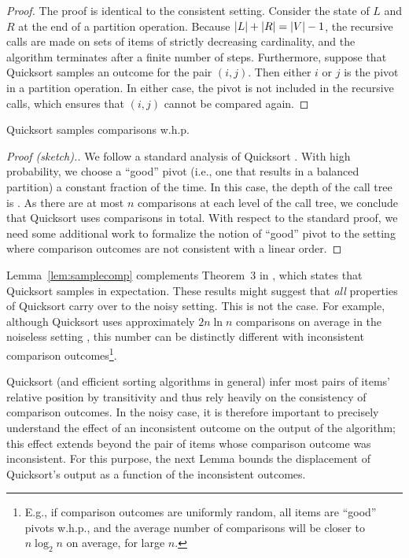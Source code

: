 \begin{proof}
The proof is identical to the consistent setting.
Consider the state of $L$ and $R$ at the end of a partition operation.
Because $\lvert L \rvert + \lvert R \rvert = \lvert V \rvert - 1$, the recursive calls are made on sets of items of strictly decreasing cardinality, and the algorithm terminates after a finite number of steps.
Furthermore, suppose that Quicksort samples an outcome for the pair $(i, j)$.
Then either $i$ or $j$ is the pivot in a partition operation.
In either case, the pivot is not included in the recursive calls, which ensures that $(i, j)$ cannot be compared again.
\end{proof}

\begin{lemma}
\label{lem:samplecomp}
Quicksort samples  comparisons w.h.p.
\end{lemma}

\begin{proof}[Proof (sketch).]
We follow a standard analysis of Quicksort \citep[see, e.g.,][Section 3.3.3]{dubhashi2009concentration}.
With high probability, we choose a ``good'' pivot (i.e., one that results in a balanced partition) a constant fraction of the time.
In this case, the depth of the call tree is .
As there are at most $n$ comparisons at each level of the call tree, we conclude that Quicksort uses  comparisons in total.
With respect to the standard proof, we need some additional work to formalize the notion of ``good'' pivot to the setting where comparison outcomes are not consistent with a linear order.
\end{proof}

Lemma~\ref{lem:samplecomp} complements Theorem~$3$ in \citet{ailon2010preference}, which states that Quicksort samples  in expectation.
These results might suggest that \emph{all} properties of Quicksort carry over to the noisy setting.
This is not the case.
For example, although Quicksort uses approximately $2n \ln n$ comparisons on average in the noiseless setting \citep{sedgewick2011algorithms}, this number can be distinctly different with inconsistent comparison outcomes\footnote{E.g., if comparison outcomes are uniformly random, all items are ``good'' pivots w.h.p., and the average number of comparisons will be closer to $n \log_2 n$ on average, for large $n$.}.

Quicksort (and efficient sorting algorithms in general) infer most pairs of items' relative position by transitivity and thus rely heavily on the consistency of comparison outcomes.
In the noisy case, it is therefore important to precisely understand the effect of an inconsistent outcome on the output of the algorithm; this effect extends beyond the pair of items whose comparison outcome was inconsistent.
For this purpose, the next Lemma bounds the displacement of Quicksort's output as a function of the inconsistent outcomes.

